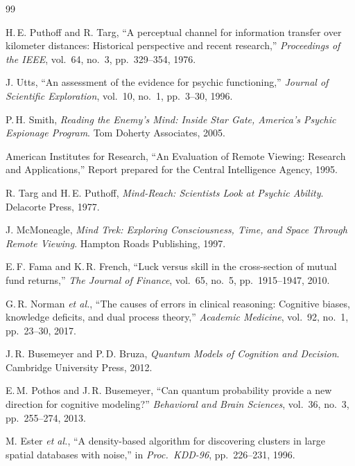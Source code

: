 \documentclass[11pt,letterpaper]{article}
\begin{document}
\begin{thebibliography}{99}

H.\,E. Puthoff and R. Targ, ``A perceptual channel for information transfer over kilometer distances: Historical perspective and recent research,'' \textit{Proceedings of the IEEE}, vol.~64, no.~3, pp.~329--354, 1976.

J. Utts, ``An assessment of the evidence for psychic functioning,'' \textit{Journal of Scientific Exploration}, vol.~10, no.~1, pp.~3--30, 1996.

P.\,H. Smith, \textit{Reading the Enemy's Mind: Inside Star Gate, America's Psychic Espionage Program}. Tom Doherty Associates, 2005.

American Institutes for Research, ``An Evaluation of Remote Viewing: Research and Applications,'' Report prepared for the Central Intelligence Agency, 1995.

R. Targ and H.\,E. Puthoff, \textit{Mind-Reach: Scientists Look at Psychic Ability}. Delacorte Press, 1977.

J. McMoneagle, \textit{Mind Trek: Exploring Consciousness, Time, and Space Through Remote Viewing}. Hampton Roads Publishing, 1997.

E.\,F. Fama and K.\,R. French, ``Luck versus skill in the cross-section of mutual fund returns,'' \textit{The Journal of Finance}, vol.~65, no.~5, pp.~1915--1947, 2010.

G.\,R. Norman \textit{et al.}, ``The causes of errors in clinical reasoning: Cognitive biases, knowledge deficits, and dual process theory,'' \textit{Academic Medicine}, vol.~92, no.~1, pp.~23--30, 2017.

J.\,R. Busemeyer and P.\,D. Bruza, \textit{Quantum Models of Cognition and Decision}. Cambridge University Press, 2012.

E.\,M. Pothos and J.\,R. Busemeyer, ``Can quantum probability provide a new direction for cognitive modeling?'' \textit{Behavioral and Brain Sciences}, vol.~36, no.~3, pp.~255--274, 2013.

M. Ester \textit{et al.}, ``A density-based algorithm for discovering clusters in large spatial databases with noise,'' in \textit{Proc.\ KDD-96}, pp.~226--231, 1996.


\end{thebibliography}
\end{document}
